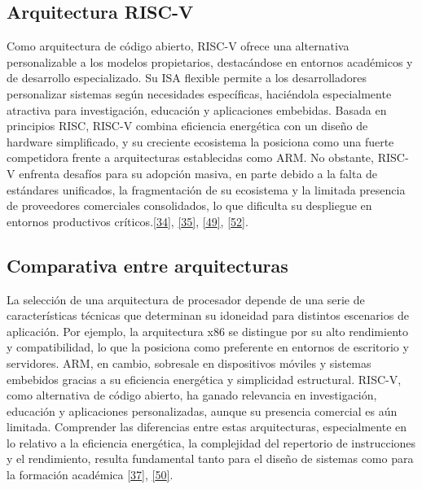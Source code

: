 \documentclass[12pt,oneside]{templates/unerthesis}
\begin{document}
\hypertarget{arquitectura-risc-v}{%
\subsection{Arquitectura RISC-V}\label{arquitectura-risc-v}}

Como arquitectura de código abierto, RISC-V ofrece una alternativa personalizable a los modelos propietarios, destacándose en entornos académicos y de desarrollo especializado. Su ISA flexible permite a los desarrolladores personalizar sistemas según necesidades específicas, haciéndola especialmente atractiva para investigación, educación y aplicaciones embebidas. Basada en principios RISC, RISC-V combina eficiencia energética con un diseño de hardware simplificado, y su creciente ecosistema la posiciona como una fuerte competidora frente a arquitecturas establecidas como ARM. No obstante, RISC-V enfrenta desafíos para su adopción masiva, en parte debido a la falta de estándares unificados, la fragmentación de su ecosistema y la limitada presencia de proveedores comerciales consolidados, lo que dificulta su despliegue en entornos productivos críticos.\protect\hyperlink{ref-waterman_risc-v_2014}{{[}34{]}}, \protect\hyperlink{ref-harris2015digital}{{[}35{]}}, \protect\hyperlink{ref-hennessy2017computer_riscv}{{[}49{]}}, \protect\hyperlink{ref-patterson2016computer}{{[}52{]}}.

\hypertarget{comparativa-entre-arquitecturas}{%
\subsection{Comparativa entre arquitecturas}\label{comparativa-entre-arquitecturas}}

La selección de una arquitectura de procesador depende de una serie de características técnicas que determinan su idoneidad para distintos escenarios de aplicación. Por ejemplo, la arquitectura x86 se distingue por su alto rendimiento y compatibilidad, lo que la posiciona como preferente en entornos de escritorio y servidores. ARM, en cambio, sobresale en dispositivos móviles y sistemas embebidos gracias a su eficiencia energética y simplicidad estructural. RISC-V, como alternativa de código abierto, ha ganado relevancia en investigación, educación y aplicaciones personalizadas, aunque su presencia comercial es aún limitada. Comprender las diferencias entre estas arquitecturas, especialmente en lo relativo a la eficiencia energética, la complejidad del repertorio de instrucciones y el rendimiento, resulta fundamental tanto para el diseño de sistemas como para la formación académica \protect\hyperlink{ref-patterson_computer_2014}{{[}37{]}}, \protect\hyperlink{ref-arm_evolution_2025}{{[}50{]}}.
\end{document}

